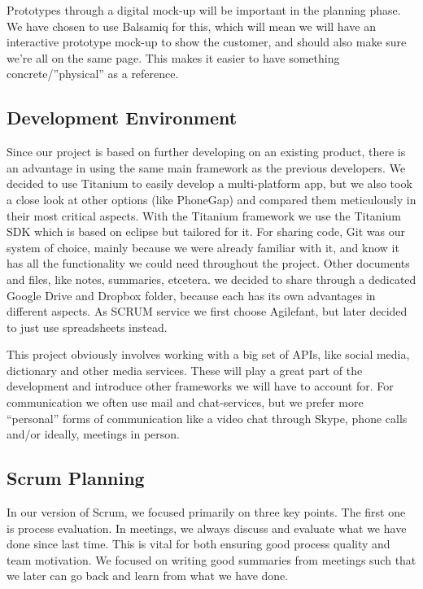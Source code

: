 Prototypes through a digital mock-up will be important in the planning phase. We have chosen to use Balsamiq for this, which will mean we will have an interactive prototype mock-up to show the customer, and should also make sure we're all on the same page. This makes it easier to have something concrete/”physical” as a reference.

\subsection{Development Environment}

Since our project is based on further developing on an existing product, there is an advantage in using the same main framework as the previous developers. We decided to use Titanium to easily develop a multi-platform app, but we also took a close look at other options (like PhoneGap) and compared them meticulously in their most critical aspects. With the Titanium framework we use the Titanium SDK which is based on eclipse but tailored for it. For sharing code, Git was our system of choice, mainly because we were already familiar with it, and know it has all the functionality we could need throughout the project. Other documents and files, like notes, summaries, etcetera. we decided to share through a dedicated Google Drive and Dropbox folder, because each has its own advantages in different aspects. As SCRUM service we first choose Agilefant, but later decided to just use spreadsheets instead.

This project obviously involves working with a big set of APIs, like social media, dictionary and other media services. These will play a great part of the development and introduce other frameworks we will have to account for. For communication we often use mail and chat-services, but we prefer more “personal” forms of communication like a video chat through Skype, phone calls and/or ideally, meetings in person.

\subsection{Scrum Planning}
In our version of Scrum, we focused primarily on three key points. The first one is process evaluation. In meetings, we always discuss and evaluate what we have done since last time. This is vital for both ensuring good process quality and team motivation. We focused on writing good summaries from meetings such that we later can go back and learn from what we have done.

